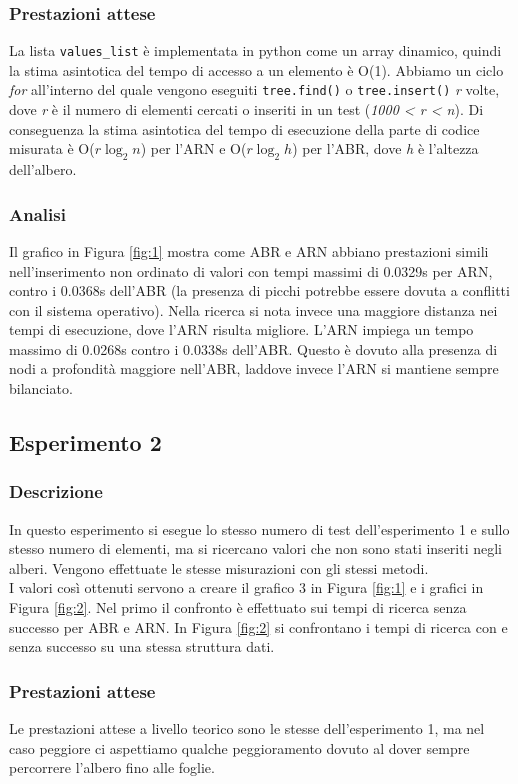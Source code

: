\documentclass{article}
\begin{document}
\subsubsection{Prestazioni attese}
La lista \verb|values_list| è implementata in python come un array dinamico, quindi la stima asintotica del tempo di accesso a un elemento è O(1). Abbiamo un ciclo \emph{for} all'interno del quale vengono eseguiti \verb|tree.find()| o \verb|tree.insert()| \emph{r} volte, dove \emph{r} è il numero di elementi cercati o inseriti in un test (\emph{1000 < r < n}). Di conseguenza la stima asintotica del tempo di esecuzione della parte di codice misurata è O(${r\log_{2}{n}}$) per l'ARN e O(${r\log_{2}{h}}$) per l'ABR, dove \emph{h} è l'altezza dell'albero.
\subsubsection{Analisi}
Il grafico in Figura \ref{fig:1} mostra come ABR e ARN abbiano prestazioni simili nell'inserimento non ordinato di valori con tempi massimi di 0.0329s per ARN, contro i 0.0368s dell'ABR (la presenza di picchi potrebbe essere dovuta a conflitti con il sistema operativo). Nella ricerca si nota invece una maggiore distanza nei tempi di esecuzione, dove l'ARN risulta migliore. L'ARN impiega un tempo massimo di 0.0268s contro i 0.0338s dell'ABR. Questo è dovuto alla presenza di nodi a profondità maggiore nell'ABR, laddove invece l'ARN si mantiene sempre bilanciato.

\subsection{Esperimento 2}
\subsubsection{Descrizione}
In questo esperimento si esegue lo stesso numero di test dell'esperimento 1 e sullo stesso numero di elementi, ma si ricercano valori che non sono stati inseriti negli alberi. Vengono effettuate le stesse misurazioni con gli stessi metodi.\\
I valori così ottenuti servono a creare il grafico 3 in Figura \ref{fig:1} e i grafici in Figura \ref{fig:2}. Nel primo il confronto è effettuato sui tempi di ricerca senza successo per ABR e ARN. In Figura \ref{fig:2} si confrontano i tempi di ricerca con e senza successo su una stessa struttura dati.
\subsubsection{Prestazioni attese}
Le prestazioni attese a livello teorico sono le stesse dell'esperimento 1, ma nel caso peggiore ci aspettiamo qualche peggioramento dovuto al dover sempre percorrere l'albero fino alle foglie.
\end{document}
